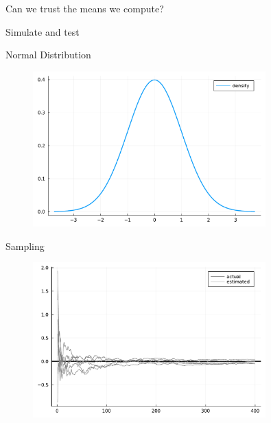 \documentclass[aspectratio=169,xcolor=svgnames]{beamer}
\begin{document}
\begin{frame}
  \center
  Can we trust the means we compute?
\end{frame}

\begin{frame}
  \center
   Simulate and test 
\end{frame}

\begin{frame}{Normal Distribution}
  \begin{figure}[ht]
    \centering
    \includegraphics[width=0.8\textwidth]{figures/normal_distribution.pdf}
  \end{figure}
\end{frame}

\begin{frame}{Sampling}
  \begin{figure}[ht]
    \centering
    \includegraphics[width=0.8\textwidth]{figures/mean_error.pdf}
  \end{figure}
\end{frame}
\end{document}
